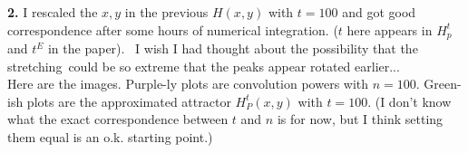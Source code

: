 \documentclass{article}
\theoremstyle{definition}
\begin{document}
\newpage











\noindent \textbf{2.} I rescaled the $x,y$ in the previous $H(x,y)$ with $t = 100$ and got good correspondence after some hours of numerical integration. ($t$ here appears in $H^t_p$ and $t^E$ in the paper).  I wish I had thought about the possibility that the stretching could be so extreme that the peaks appear rotated earlier...\\

Here are the images. Purple-ly plots are convolution powers with $n = 100$. Green-ish plots are the approximated attractor $H^t_P(x,y)$ with $t = 100$. (I don't know what the exact correspondence between $t$ and $n$ is for now, but I think setting them equal is an o.k. starting point.)
\end{document}
